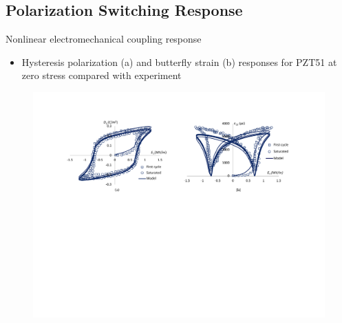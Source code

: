 \documentclass{beamer}
\begin{document}
\subsection{Polarization Switching Response}

\begin{frame}{Nonlinear electromechanical coupling response}
   \begin{itemize}
  \item Hysteresis polarization (a) and butterfly strain (b) responses for PZT51 at zero stress compared with experiment \cite{raey}
  \end{itemize} 
\begin{figure}
\centering
\includegraphics[scale=0.55,trim = 30mm 100mm 50mm 30mm]{../images/HysteresisPolarizationButterflyStrainResponsesPZT51ZeroStress.pdf}
\end{figure}
\end{frame}
\end{document}
